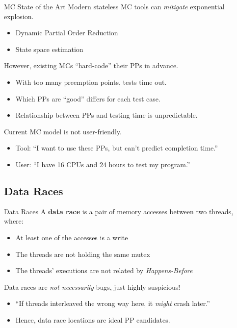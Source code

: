 \documentclass[xcolor=dvipsnames]{beamer}
\begin{document}
\begin{frame}{MC State of the Art}
	Modern stateless MC tools can {\em mitigate} exponential explosion.
	\begin{itemize}
		\item Dynamic Partial Order Reduction
		\item State space estimation
	\end{itemize}
	\linegap

	However, existing MCs ``hard-code'' their PPs in advance.
	\begin{itemize}
		\item With too many preemption points, tests time out.
		\item Which PPs are ``good'' differs for each test case.
		\item Relationship between PPs and testing time is unpredictable.
	\end{itemize}
	\linegap

	Current MC model is not user-friendly.
	\begin{itemize}
		\item Tool: ``I want to use these PPs, but can't predict completion time.''
		\item User: ``I have 16 CPUs and 24 hours to test my program.''
	\end{itemize}
\end{frame}


\subsection{Data Races}

\begin{frame}{Data Races}
	A {\bf data race} is a pair of memory accesses between two threads, where:
	\begin{itemize}
		\item At least one of the accesses is a write
		\item The threads are not holding the same mutex
		\item The threads' executions are not related by {\em Happens-Before}
	\end{itemize}

	Data races are {\em not necessarily} bugs, just highly suspicious!
	\begin{itemize}
		\item ``If threads interleaved the wrong way here, it {\em might} crash later.''
		\item Hence, data race locations are ideal PP candidates.
	\end{itemize}
\end{frame}
\end{document}
